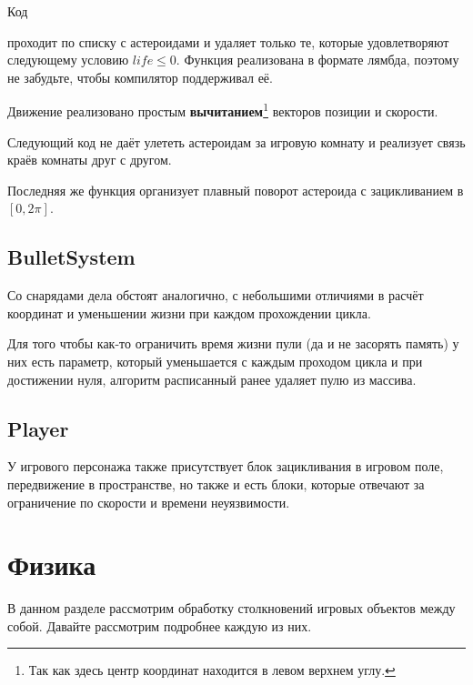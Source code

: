 Код

проходит по списку с астероидами и удаляет только те, которые удовлетворяют следующему 
условию \( life \leq 0 \). Функция реализована в формате лямбда, поэтому не забудьте, 
чтобы компилятор поддерживал её.

Движение реализовано простым \textbf{вычитанием}\footnote{Так как здесь центр координат 
находится в левом верхнем углу.} векторов позиции и скорости. 

Следующий код не даёт улететь астероидам за игровую комнату и реализует связь краёв 
комнаты друг с другом.


Последняя же функция организует плавный поворот астероида с зацикливанием в 
\( [0, 2\pi] \).


\newpage

\subsection{BulletSystem}
Со снарядами дела обстоят аналогично, с небольшими отличиями в расчёт координат и 
уменьшении жизни при каждом прохождении цикла.


Для того чтобы как-то ограничить время жизни пули (да и не засорять память) у них есть 
параметр, который уменьшается с каждым проходом цикла и при достижении нуля, алгоритм 
расписанный ранее удаляет пулю из массива.

\newpage

\subsection{Player}
У игрового персонажа также присутствует блок зацикливания в игровом поле, передвижение 
в пространстве, но также и есть блоки, которые отвечают за ограничение по скорости и 
времени неуязвимости.


\newpage

\section{Физика}
В данном разделе рассмотрим обработку столкновений игровых объектов между собой. 
Давайте рассмотрим подробнее каждую из них.

